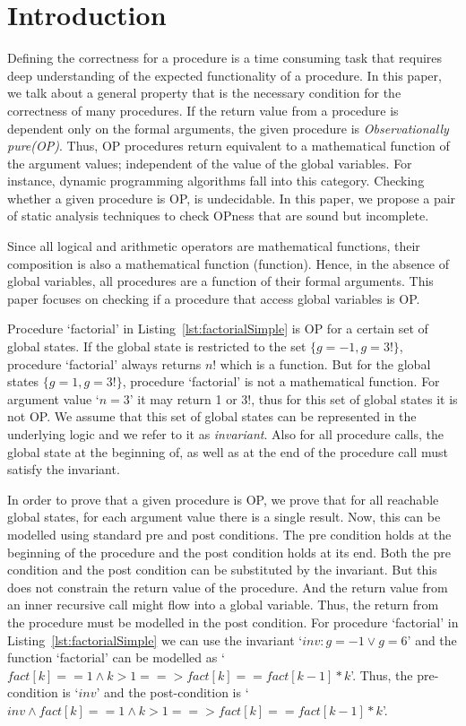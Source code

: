 \documentclass{llncs}
\newcommand{\inv}{\mathit{inv}}
\newcommand{\fact}{\mathit{fact}}
\begin{document}
\section{Introduction}
Defining the correctness for a procedure is a time consuming task that
requires deep understanding of the expected functionality of a
procedure. In this paper, we talk about a general property that is the
necessary condition for the correctness of many procedures. If the
return value from a procedure is dependent only on the formal
arguments, the given procedure is \textit{Observationally
  pure(OP)}. Thus, OP procedures return equivalent to a mathematical
function of the argument values; independent of the value of the
global variables. For instance, dynamic programming algorithms fall
into this category. Checking whether a given procedure is OP, is
undecidable. In this paper, we propose a pair of static analysis
techniques to check OPness that are sound but incomplete.

Since all logical and arithmetic operators are mathematical functions,
their composition is also a mathematical function (function). Hence,
in the absence of global variables, all procedures are a function of
their formal arguments. This paper focuses on checking if a procedure
that access global variables is OP. 

Procedure `factorial' in Listing~\ref{lst:factorialSimple} is OP for a
certain set of global states. If the global state is restricted to the
set $\{g = -1, g = 3!\}$, procedure `factorial' always returns $n!$
which is a function. But for the global states $\{g =1, g = 3!\}$,
procedure `factorial' is not a mathematical function. For argument
value `$n = 3$' it may return 1 or 3!, thus for this set of global
states it is not OP.  We assume that this set of global states can be
represented in the underlying logic and we refer to it as
\textit{invariant}. Also for all procedure calls, the global state at
the beginning of, as well as at the end of the procedure call must
satisfy the invariant.

In order to prove that a given procedure is OP, we prove that for all
reachable global states, for each argument value there is a single
result. Now, this can be modelled using standard pre and post
conditions. The pre condition holds at the beginning of the procedure
and the post condition holds at its end. Both the pre condition and
the post condition can be substituted by the invariant. But this does
not constrain the return value of the procedure. And the return value from
an inner recursive call might flow into a global variable. Thus,
the return from the procedure must be modelled in the post condition.
For procedure `factorial' in Listing~\ref{lst:factorialSimple}
we can use the invariant `$\inv : g = -1 \vee g = 6$' and the function
`factorial' can be modelled as `$\fact[k] == 1 \wedge k >1 ==> \fact[k]
== \fact[k-1]*k$'. Thus, the pre-condition is `$\inv$' and the
post-condition is `$\inv \wedge \fact[k] == 1 \wedge k >1 ==> \fact[k]
== \fact[k-1]*k$'.
\end{document}
